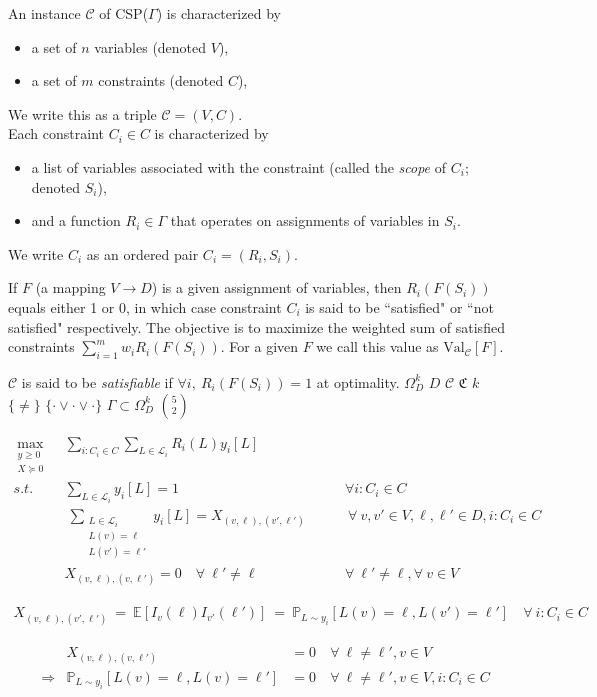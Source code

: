 \documentclass[12pt]{article}
\newcommand{\al}[1]{\begin{align}#1\end{align}}
\newcommand{\rr}{\Rightarrow}
\newcommand{\fa}{\ \forall \ }
\newcommand{\Pb}{\mathbb{P}}
\newcommand{\Ex}{\mathbb{E}}
\newcommand{\lrb}[1]{\left(#1\right)}
\newcommand{\lrbb}[1]{\left[#1\right]}
\begin{document}
\begin{multicols}{2}
\noindent An instance $\mathcal{C}$ of CSP($\Gamma$) is characterized by
\begin{itemize}
\item a set of $n$ variables (denoted $V$), 
\item a set of $m$ constraints (denoted $C$),
\end{itemize}
We write this as a triple $\mathcal{C} = (V,C)$.
\columnbreak
\\
\noindent Each constraint $C_i \in C$ is characterized by
\begin{itemize}
\item a list of variables associated with the constraint (called the \textit{scope} of $C_i$; denoted $S_i$),
\item and a function $R_i \in \Gamma$ that operates on assignments of variables in $S_i$.
\end{itemize}
We write $C_i$ as an ordered pair $C_i = (R_i, S_i)$.
\end{multicols}
If $F$ (a mapping $ V\to D$) is a given assignment of variables, then $R_i(F(S_i))$ equals either 1 or 0, in which case constraint $C_i$ is said to be ``satisfied" or ``not satisfied" respectively.
The objective is to maximize the weighted sum of satisfied constraints $\sum_{i = 1}^m w_i R_i(F(S_i))$. For a given $F$ we call this value as  $\text{Val}_{\mathcal{C}}[F]$.

$\mathcal{C}$ is said to be \textit{satisfiable} if $\forall i, ~ R_i(F(S_i)) = 1$ at optimality.
\newpage
$\Omega_D^k$ \qquad  $D$ \qquad $\mathcal{C}$ \qquad $ \mathfrak{C}$ \qquad $k$ \qquad $\{\neq\}$ \qquad $\{ \cdot \vee \cdot \vee \cdot \}$ \qquad $\Gamma \subset \Omega_D^k$ \qquad ${5 \choose 2}$
\newline
\newline

\begin{alignat}{2}
\max_{\substack{y \geq 0 \\ X \succeq 0 }} ~&~ 
	\sum_{i : C_i\in C} \sum_{L \in \mathcal{L}_i} R_i(L) y_i[L]  & \nonumber \\
s.t. ~ & ~ \sum_{L \in \mathcal{L}_i} y_i[L] = 1  & \forall i : C_i \in C  \\
     ~ & ~~ \sum_{\substack{L\in \mathcal{L}_{i} \\ L(v) = \ell \\ L(v')=\ell'} } y_{i}[L]  = X_{\lrb{v, \ell},\lrb{v', \ell'}}  \qquad &~\forall ~ v,v' \in V, \ell,\ell' \in D, i : C_i \in C \\
     ~& ~ X_{\lrb{v, \ell},\lrb{v, \ell'}} = 0 \quad \forall ~ \ell' \neq \ell & \forall ~ \ell' \neq \ell,  \forall ~ v \in V 
\end{alignat}

\al{
X_{\lrb{v, \ell},\lrb{v', \ell'}} ~ = ~ \Ex\lrbb{I_v(\ell) I_{v'}(\ell')}  ~ = ~ \Pb_{L\sim y_i} \lrbb{L(v) = \ell, L(v')= \ell'} \quad \forall ~ i : C_i \in C
}

\al{
&&X_{\lrb{v, \ell},\lrb{v, \ell'}} &= 0 &\fa \ell \neq \ell' , v \in V\\
&\rr &\Pb_{L \sim y_{i}}\lrbb{L(v) = \ell, L(v)= \ell'} &= 0 &\fa \ell \neq \ell', v \in V, i:C_i \in C
}
\end{document}
